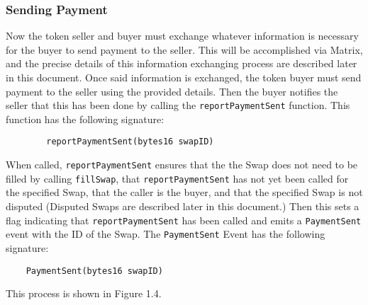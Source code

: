 \documentclass[11pt]{article}
\begin{document}

    \subsubsection*{Sending Payment}

    Now the token seller and buyer must exchange whatever information is necessary for the buyer to
    send payment to the seller.
    This will be accomplished via Matrix, and the precise details of this information exchanging
    process are described later in this document.
    Once said information is exchanged, the token buyer must send payment to the seller using the
    provided details.
    Then the buyer notifies the seller that this has been done by calling the
    \verb|reportPaymentSent| function.
    This function has the following signature:
    \begin{verbatim}
        reportPaymentSent(bytes16 swapID)
    \end{verbatim}

    When called, \verb|reportPaymentSent| ensures that the the Swap does not need to be filled by
    calling \verb|fillSwap|, that \verb|reportPaymentSent| has not yet been called for the specified
    Swap, that the caller is the buyer, and that the specified Swap is not disputed (Disputed Swaps
    are described later in this document.) Then this sets a flag indicating that
    \verb|reportPaymentSent| has been called and emits a \verb|PaymentSent| event with the ID of the
    Swap.
    The \verb|PaymentSent| Event has the following signature:
    \begin{verbatim}
    PaymentSent(bytes16 swapID)
    \end{verbatim}
    This process is shown in Figure 1.4.
\end{document}
